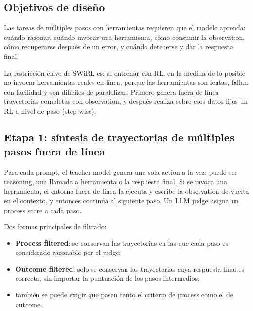 \documentclass[a4paper]{article}
\begin{document}
\subsection{Objetivos de diseño}

Las tareas de múltiples pasos con herramientas requieren que el modelo aprenda: cuándo razonar, cuándo invocar una herramienta, cómo consumir la observation, cómo recuperarse después de un error, y cuándo detenerse y dar la respuesta final.



La restricción clave de SWiRL es: al entrenar con RL, en la medida de lo posible no invocar herramientas reales en línea, porque las herramientas son lentas, fallan con facilidad y son difíciles de paralelizar. Primero genera fuera de línea trayectorias completas con observation, y después realiza sobre esos datos fijos un RL a nivel de paso (step-wise).

\subsection{Etapa 1: síntesis de trayectorias de múltiples pasos fuera de línea}

Para cada prompt, el teacher model genera una sola action a la vez: puede ser reasoning, una llamada a herramienta o la respuesta final. Si se invoca una herramienta, el entorno fuera de línea la ejecuta y escribe la observation de vuelta en el contexto, y entonces continúa al siguiente paso. Un LLM judge asigna un process score a cada paso.


Dos formas principales de filtrado:

\begin{itemize}
    \item \textbf{Process filtered}: se conservan las trayectorias en las que cada paso es considerado razonable por el judge;
    \item \textbf{Outcome filtered}: solo se conservan las trayectorias cuya respuesta final es correcta, sin importar la puntuación de los pasos intermedios;
    \item también se puede exigir que pasen tanto el criterio de process como el de outcome.
\end{itemize}
\end{document}
